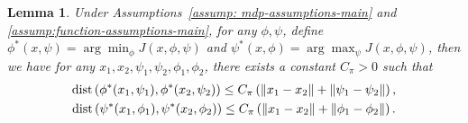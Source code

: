 \documentclass{article}
\theoremstyle{plain}
\newtheorem{lemma}{Lemma}
\theoremstyle{definition}
\theoremstyle{remark}
\begin{document}
\begin{lemma}
    \label{lemma: lipschitz-constant-of-optimal-parameters}
    Under Assumptions~\ref{assump: mdp-assumptions-main} and \ref{assump:function-assumptions-main}, for any $\phi,\psi$, define $\phi^*(x,\psi) = \arg\min_{\phi} J(x,\phi,\psi)$ and $\psi^*(x,\phi) = \arg\max_{\psi} J(x,\phi,\psi)$, then we have for any $x_1, x_2, \psi_1,\psi_2,\phi_1,\phi_2$, there exists a constant $C_{\pi}>0$ such that
    \begin{gather}
        \operatorname{dist} \left(\phi^*(x_1,\psi_1), \phi^*(x_2,\psi_2)\right) \leq C_{\pi}  \left( \| x_1 - x_2 \| + \| \psi_1 - \psi_2 \| \right) , \notag \\
        \operatorname{dist} \left(\psi^*(x_1,\phi_1), \psi^*(x_2,\phi_2)\right)  \leq C_{\pi}  \left( \| x_1 - x_2 \| + \| \phi_1 - \phi_2 \| \right)\notag .
    \end{gather}
\end{lemma}
\end{document}
